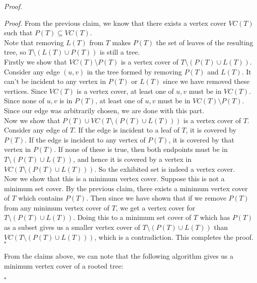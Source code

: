 \documentclass[a4paper]{article}
\newenvironment{proof}{\begin{breakbox}\textit{Proof.}}{\hfill$\square$\end{breakbox}}
\newcommand{\nl}{\vspace{0.2cm}\\}
\begin{document}
\begin{proof}
    \begin{proof}
        From the previous claim, we know that there exists a vertex cover $VC(T)$ such that $P(T) \subseteq VC(T)$.\nl
        Note that removing $L(T)$ from $T$ makes $P(T)$ the set of leaves of the resulting tree, so $T \setminus (L(T) \cup P(T))$ is still a tree.\nl
        Firstly we show that $VC(T) \setminus P(T)$ is a vertex cover of $T \setminus (P(T) \cup L(T))$. Consider any edge $(u, v)$ in the tree formed by removing $P(T)$ and $L(T)$. It can't be
        incident to any vertex in $P(T)$ or $L(T)$ since we have removed these vertices. Since $VC(T)$ is a vertex cover, at least one of $u, v$ must be in $VC(T)$. Since none of $u, v$ is
        in $P(T)$, at least one of $u, v$ must be in $VC(T) \setminus P(T)$. Since our edge was arbitrarily chosen, we are done with this part.\nl
        Now we show that $P(T) \cup VC(T \setminus (P(T) \cup L(T)))$ is a vertex cover of $T$. Consider any edge of $T$. If the edge is incident to a leaf of $T$, it is covered by $P(T)$. If
        the edge is incident to any vertex of $P(T)$, it is covered by that vertex in $P(T)$. If none of these is true, then both endpoints must be in $T \setminus (P(T) \cup L(T))$, and hence
        it is covered by a vertex in $VC(T \setminus (P(T) \cup L(T)))$. So the exhibited set is indeed a vertex cover.\nl
        Now we show that this is a minimum vertex cover. Suppose this is not a minimum set cover. By the previous claim, there exists a minimum vertex cover of $T$ which contains $P(T)$. Then
        since we have shown that if we remove $P(T)$ from any minimum vertex cover of $T$, we get a vertex cover for $T \setminus (P(T) \cup L(T))$. Doing this to a minimum set cover of $T$ which
        has $P(T)$ as a subset gives us a smaller vertex cover of $T \setminus (P(T) \cup L(T))$ than $VC(T \setminus (P(T) \cup L(T)))$, which is a contradiction. This completes the proof.
    \end{proof}
    From the claims above, we can note that the following algorithm gives us
    a minimum vertex cover of a rooted tree:
    \begin{algorithmic}[1]

\end{algorithmic}
\end{proof}
\end{document}
